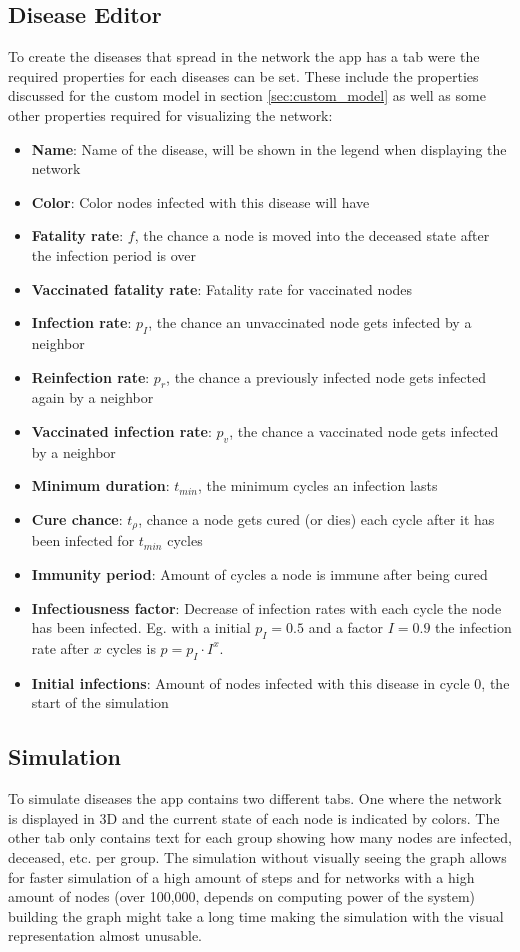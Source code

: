 \subsection{Disease Editor}
To create the diseases that spread in the network the app has a tab were the required properties
for each diseases can be set. These include the properties discussed for the custom model in
section \ref{sec:custom_model} as well as some other properties required for visualizing the network:
\begin{itemize}
    \item \textbf{Name}: Name of the disease, will be shown in the legend when displaying the network
    \item \textbf{Color}: Color nodes infected with this disease will have
    \item \textbf{Fatality rate}: $f$, the chance a node is moved into the deceased state after the infection period is over
    \item \textbf{Vaccinated fatality rate}: Fatality rate for vaccinated nodes
    \item \textbf{Infection rate}: $p_I$, the chance an unvaccinated node gets infected by a neighbor
    \item \textbf{Reinfection rate}: $p_r$, the chance a previously infected node gets infected again by a neighbor
    \item \textbf{Vaccinated infection rate}: $p_v$, the chance a vaccinated node gets infected by a neighbor
    \item \textbf{Minimum duration}: $t_{min}$, the minimum cycles an infection lasts
    \item \textbf{Cure chance}: $t_\rho$, chance a node gets cured (or dies) each cycle after it has been
    infected for $t_{min}$ cycles
    \item \textbf{Immunity period}: Amount of cycles a node is immune after being cured
    \item \textbf{Infectiousness factor}: Decrease of infection rates with each cycle the node has been infected.
    Eg. with a initial $p_I = 0.5$ and a factor $I = 0.9$ the infection rate after $x$ cycles is $p = p_I \cdot I^x$.
    \item \textbf{Initial infections}: Amount of nodes infected with this disease in cycle 0, the start of the simulation
\end{itemize}

\subsection{Simulation}
To simulate diseases the app contains two different tabs. One where the network is displayed
in 3D and the current state of each node is indicated by colors. The other tab only contains
text for each group showing how many nodes are infected, deceased, etc. per group. The simulation
without visually seeing the graph allows for faster simulation of a high amount of steps and for
networks with a high amount of nodes (over 100,000, depends on computing power of the system)
building the graph might take a long time making the simulation with the visual representation
almost unusable.

